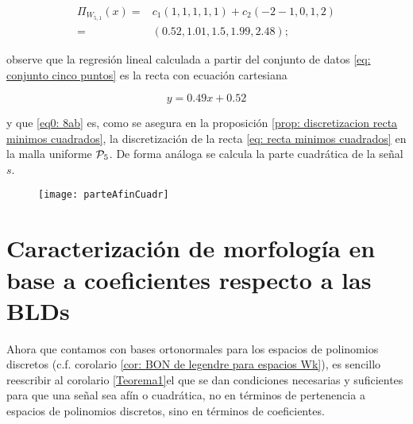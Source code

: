 \begin{ejemplo}
\begin{align}
\label{eq0: 8ab}
\Pi_{W_{5,1}}(x) =& c_{1} (1,1,1,1,1) + c_{2}(-2-1,0,1,2) \nonumber \\
= & (0.52, 1.01, 1.5, 1.99, 2.48 );
\end{align}

observe que 
la regresión lineal calculada a partir
del conjunto de datos
\eqref{eq: conjunto cinco puntos}
es la recta
con ecuación cartesiana

\begin{equation} \label{eq: recta minimos cuadrados}
y=0.49x+0.52
\end{equation}

y que \eqref{eq0: 8ab} es, 
como se asegura en la proposición
\ref{prop: discretizacion recta minimos cuadrados}, la discretización de 
la recta \eqref{eq: recta minimos cuadrados}
en la malla uniforme $\mathcal{P}_{5}$.
De forma análoga se calcula la parte cuadrática de
la señal $s$.

\begin{figure}[H]
	\centering
	\texttt{[image: parteAfinCuadr]}
\end{figure}	
\final
\end{ejemplo}


\section{Caracterización de morfología en base a coeficientes respecto a las BLDs}
\label{Caracterización de la morfología en términos de coeficientes respecto a la base de Legendre discreta}


Ahora que contamos con bases ortonormales
para los espacios de polinomios discretos
(c.f. corolario \ref{cor: BON de legendre para espacios Wk}),
es sencillo reescribir al corolario
\ref{Teorema1}el que se dan condiciones necesarias y suficientes para que
una señal sea afín o cuadrática,
no en términos de pertenencia a espacios de polinomios
discretos,
sino en términos de coeficientes.


